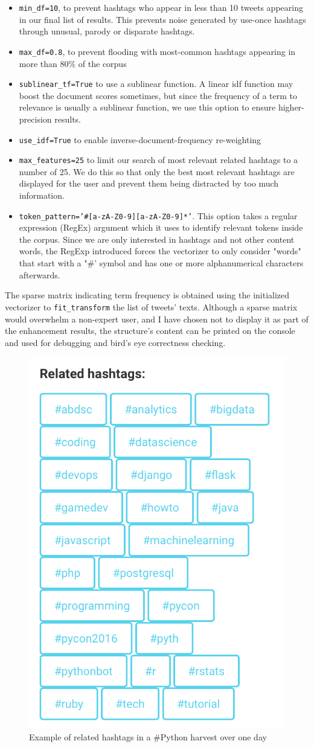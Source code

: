 \begin{itemize}
\item \texttt{min\_df=10}, to prevent hashtags who appear in less than 10 tweets appearing in our final list of results. This prevents noise generated by use-once hashtags through unusual, parody or disparate hashtags.
\item \texttt{max\_df=0.8}, to prevent flooding with most-common hashtags appearing in more than 80\% of the corpus
\item \texttt{sublinear\_tf=True} to use a sublinear function. A linear idf function may boost the document scores sometimes, but since the frequency of a term to relevance is usually a sublinear function, we use this option to ensure higher-precision results.
\item \texttt{use\_idf=True} to enable inverse-document-frequency re-weighting
\item \texttt{max\_features=25} to limit our search of most relevant related hashtags to a number of 25. We do this so that only the best most relevant hashtags are displayed for the user and prevent them being distracted by too much information.
\item \texttt{token\_pattern='\#[a-zA-Z0-9][a-zA-Z0-9]*'}. This option takes a regular expression (RegEx) argument which it uses to identify relevant tokens inside the corpus. Since we are only interested in hashtags and not other content words, the RegExp introduced forces the vectorizer to only consider "words" that start with a "\#' symbol and has one or more alphanumerical characters afterwards.
\end{itemize}

The sparse matrix indicating term frequency is obtained using the initialized vectorizer to \texttt{fit\_transform} the list of tweets' texts. Although a sparse matrix would overwhelm a non-expert user, and I have chosen not to display it as part of the enhancement results, the structure's content can be printed on the console and used for debugging and bird's eye correctness checking.

\begin{figure}[ht]
    \centering
\includegraphics[width=0.4\columnwidth]{img/relhashtags.png}
    \caption{Example of related hashtags in a \#Python harvest over one day}
    \label{fig:relhashtags}
\end{figure}

